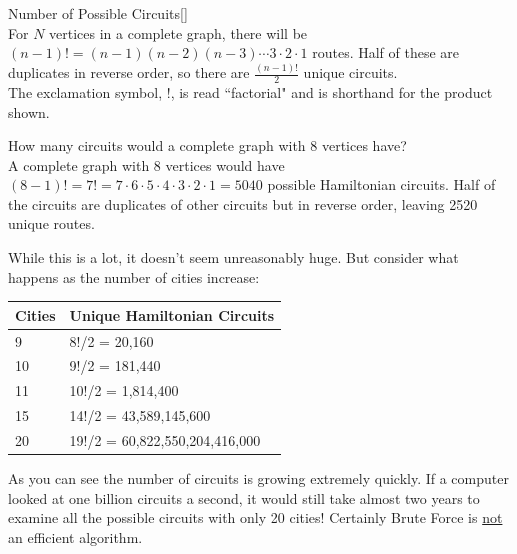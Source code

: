 \begin{theorem}{Number of Possible Circuits}[]
\hspace{1in}\\
For $N$ vertices in a complete graph, there will be $(n-1)!=(n-1)(n-2)(n-3)\cdots 3\cdot 2\cdot 1$ routes.  Half of these are duplicates in reverse order, so there are $\frac{(n-1)!}{2}$ unique circuits.\\

\noindent The exclamation symbol, $!$,  is read ``factorial" and is shorthand for the product shown.
\end{theorem}

\begin{example}{} %
How many circuits would a complete graph with 8 vertices have?\\

A complete graph with 8 vertices would have $(8-1)!=7!=7\cdot 6 \cdot 5\cdot 4\cdot 3\cdot 2\cdot 1 = 5040$ possible Hamiltonian circuits.  Half of the circuits are duplicates of other circuits but in reverse order, leaving 2520 unique routes.  
\end{example}

While this is a lot, it doesn't seem unreasonably huge.  But consider what happens as the number of cities increase:
\begin{center}
\begin{tabular}{|l|l|}
\hline
Cities &Unique Hamiltonian Circuits\\
\hline
9&8!/2 = 20,160\\
\hline
10&9!/2 = 181,440\\
\hline
11&10!/2 = 1,814,400\\
\hline
15 &14!/2 = 43,589,145,600\\
\hline
20&19!/2 = 60,822,550,204,416,000\\
\hline
\end{tabular}
\par{}\label{tab:graphtheory-dor1-tab06}%

\end{center}

As you can see the number of circuits is growing extremely quickly.  If a computer looked at one billion circuits a second, it would still take almost two years to examine all the possible circuits with only 20 cities!  Certainly Brute Force is \underline{not} an efficient algorithm.  

